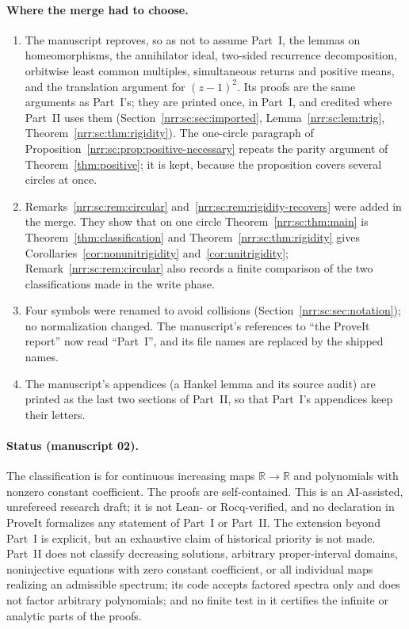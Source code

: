 \documentclass[11pt,letterpaper]{article}
\theoremstyle{definition}
\theoremstyle{remark}
\newcommand{\R}{\mathbb R}
\begin{document}
\paragraph{Where the merge had to choose.}
\begin{enumerate}[label=\textnormal{(\alph*)},leftmargin=2.2em]
\item The manuscript reproves, so as not to assume Part~I, the lemmas on
homeomorphisms, the annihilator ideal, two-sided recurrence decomposition,
orbitwise least common multiples, simultaneous returns and positive means, and
the translation argument for $(z-1)^2$. Its proofs are the same arguments as
Part~I's; they are printed once, in Part~I, and credited where Part~II uses
them (Section~\ref{nrr:sc:sec:imported}, Lemma~\ref{nrr:sc:lem:trig},
Theorem~\ref{nrr:sc:thm:rigidity}). The one-circle paragraph of
Proposition~\ref{nrr:sc:prop:positive-necessary} repeats the parity argument
of Theorem~\ref{thm:positive}; it is kept, because the proposition covers
several circles at once.
\item Remarks~\ref{nrr:sc:rem:circular} and~\ref{nrr:sc:rem:rigidity-recovers}
were added in the merge. They show that on one circle
Theorem~\ref{nrr:sc:thm:main} is Theorem~\ref{thm:classification} and
Theorem~\ref{nrr:sc:thm:rigidity} gives Corollaries~\ref{cor:nonunitrigidity}
and~\ref{cor:unitrigidity}; Remark~\ref{nrr:sc:rem:circular} also records a
finite comparison of the two classifications made in the write phase.
\item Four symbols were renamed to avoid collisions
(Section~\ref{nrr:sc:sec:notation}); no normalization changed. The
manuscript's references to ``the ProveIt report'' now read ``Part~I'', and its
file names are replaced by the shipped names.
\item The manuscript's appendices (a Hankel lemma and its source audit) are
printed as the last two sections of Part~II, so that Part~I's appendices keep
their letters.
\end{enumerate}

\paragraph{Status (manuscript 02).}
The classification is for continuous increasing maps $\R\to\R$ and
polynomials with nonzero constant coefficient. The proofs are
self-contained. This is an AI-assisted, unrefereed research draft; it is not
Lean- or Rocq-verified, and no declaration in ProveIt formalizes any statement
of Part~I or Part~II. The extension beyond Part~I is explicit, but an
exhaustive claim of historical priority is not made. Part~II does not classify
decreasing solutions, arbitrary proper-interval domains, noninjective equations
with zero constant coefficient, or all individual maps realizing an admissible
spectrum; its code accepts factored spectra only and does not factor arbitrary
polynomials; and no finite test in it certifies the infinite or analytic parts
of the proofs.
\end{document}
